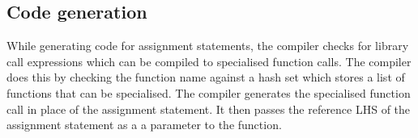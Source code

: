 \subsection{Code generation}
While generating code for assignment statements, the compiler checks for library call expressions which can be compiled to specialised function calls. The compiler does this by checking the function name against a hash set which stores a list of functions that can be specialised. The compiler generates the specialised function call in place of the assignment statement. It then passes the reference LHS of the assignment statement as a a parameter to the function. 

